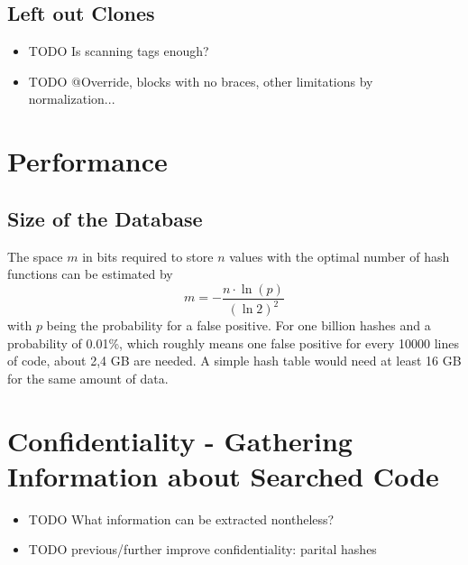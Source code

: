 \subsection{Left out Clones}
\begin{itemize}
	\item TODO Is scanning tags enough?
	\item TODO @Override, blocks with no braces, other limitations by normalization...
\end{itemize}

\section{Performance}
\subsection{Size of the Database}
The space $m$ in bits required to store $n$ values with the optimal number of hash functions can be estimated by 
\begin{equation}\label{equ:bloom_probability} %
m = -\frac{n\cdot \ln(p)}{(\ln2)^{2}}
\end{equation}
with $p$ being the probability for a false positive.
For one billion hashes and a probability of 0.01\%, which roughly means one false positive for every 10000 lines of code, about 2,4 GB are needed.
A simple hash table would need at least 16 GB for the same amount of data.

\section{Confidentiality - Gathering Information about Searched Code}
\begin{itemize}
	\item TODO What information can be extracted nontheless?
	\item TODO previous/further improve confidentiality: parital hashes
\end{itemize}